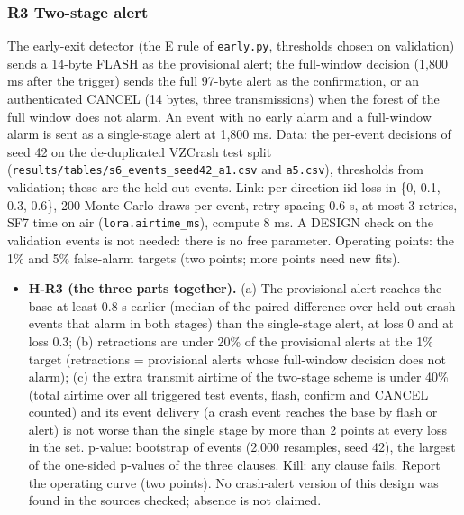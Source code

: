 \subsubsection*{R3 Two-stage alert}
The early-exit detector (the E rule of \texttt{early.py}, thresholds chosen on validation) sends a 14-byte FLASH as the provisional alert; the full-window decision (1,800 ms after the trigger) sends the full 97-byte alert as the confirmation, or an authenticated CANCEL (14 bytes, three transmissions) when the forest of the full window does not alarm. An event with no early alarm and a full-window alarm is sent as a single-stage alert at 1,800 ms. Data: the per-event decisions of seed 42 on the de-duplicated VZCrash test split (\texttt{results/tables/s6\_events\_seed42\_a1.csv} and \texttt{a5.csv}), thresholds from validation; these are the held-out events. Link: per-direction iid loss in \{0, 0.1, 0.3, 0.6\}, 200 Monte Carlo draws per event, retry spacing 0.6 s, at most 3 retries, SF7 time on air (\texttt{lora.airtime\_ms}), compute 8 ms. A DESIGN check on the validation events is not needed: there is no free parameter. Operating points: the 1\% and 5\% false-alarm targets (two points; more points need new fits).
\begin{itemize}
\item \textbf{H-R3 (the three parts together).} (a) The provisional alert reaches the base at least 0.8 s earlier (median of the paired difference over held-out crash events that alarm in both stages) than the single-stage alert, at loss 0 and at loss 0.3; (b) retractions are under 20\% of the provisional alerts at the 1\% target (retractions = provisional alerts whose full-window decision does not alarm); (c) the extra transmit airtime of the two-stage scheme is under 40\% (total airtime over all triggered test events, flash, confirm and CANCEL counted) and its event delivery (a crash event reaches the base by flash or alert) is not worse than the single stage by more than 2 points at every loss in the set. p-value: bootstrap of events (2,000 resamples, seed 42), the largest of the one-sided p-values of the three clauses. Kill: any clause fails. Report the operating curve (two points). No crash-alert version of this design was found in the sources checked; absence is not claimed.
\end{itemize}

